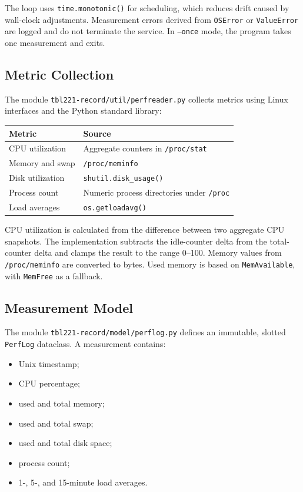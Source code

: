 \documentclass[11pt,a4paper]{article}
\begin{document}
The loop uses \texttt{time.monotonic()} for scheduling, which reduces drift caused by wall-clock adjustments. Measurement errors derived from \texttt{OSError} or \texttt{ValueError} are logged and do not terminate the service. In \texttt{--once} mode, the program takes one measurement and exits.

\subsection{Metric Collection}

The module \texttt{tbl221-record/util/perfreader.py} collects metrics using Linux interfaces and the Python standard library:

\begin{longtable}{@{}ll@{}}
\toprule
Metric & Source \\
\midrule
CPU utilization & Aggregate counters in \texttt{/proc/stat} \\
Memory and swap & \texttt{/proc/meminfo} \\
Disk utilization & \texttt{shutil.disk\_usage()} \\
Process count & Numeric process directories under \texttt{/proc} \\
Load averages & \texttt{os.getloadavg()} \\
\bottomrule
\end{longtable}

CPU utilization is calculated from the difference between two aggregate CPU snapshots. The implementation subtracts the idle-counter delta from the total-counter delta and clamps the result to the range 0--100. Memory values from \texttt{/proc/meminfo} are converted to bytes. Used memory is based on \texttt{MemAvailable}, with \texttt{MemFree} as a fallback.

\subsection{Measurement Model}

The module \texttt{tbl221-record/model/perflog.py} defines an immutable, slotted \texttt{PerfLog} dataclass. A measurement contains:

\begin{itemize}
  \item Unix timestamp;
  \item CPU percentage;
  \item used and total memory;
  \item used and total swap;
  \item used and total disk space;
  \item process count;
  \item 1-, 5-, and 15-minute load averages.
\end{itemize}
\end{document}
